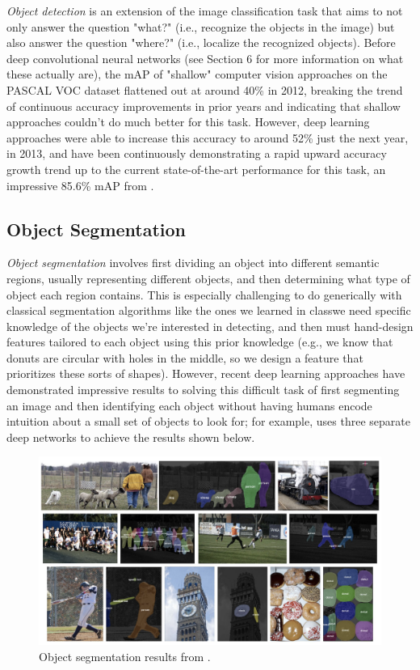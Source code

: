 \documentclass{article}
\begin{document}
\textit{Object detection} is an extension of the image classification task that aims to not only answer the question "what?" (i.e., recognize the objects in the image) but also answer the question "where?" (i.e., localize the recognized objects). Before deep convolutional neural networks (see Section 6 for more information on what these actually are), the mAP of "shallow" computer vision approaches on the PASCAL VOC dataset \cite{everingham2015pascal} flattened out at around 40\% in 2012, breaking the trend of continuous accuracy improvements in prior years and indicating that shallow approaches couldn't do much better for this task. However, deep learning approaches were able to increase this accuracy to around 52\% just the next year, in 2013, and have been continuously demonstrating a rapid upward accuracy growth trend up to the current state-of-the-art performance for this task, an impressive 85.6\% mAP from \cite{he2016deep}.

\subsection{Object Segmentation}

\textit{Object segmentation} involves first dividing an object into different semantic regions, usually representing different objects, and then determining what type of object each region contains. This is especially challenging to do generically with classical segmentation algorithms like the ones we learned in class\textemdash we need specific knowledge of the objects we're interested in detecting, and then must hand-design features tailored to each object using this prior knowledge (e.g., we know that donuts are circular with holes in the middle, so we design a feature that prioritizes these sorts of shapes). However, recent deep learning approaches have demonstrated impressive results to solving this difficult task of first segmenting an image and then identifying each object without having humans encode intuition about a small set of objects to look for; for example, \cite{semseg} uses three separate deep networks to achieve the results shown below.


\begin{figure}[b]
\includegraphics[width=12cm]{segmentation.png}
\centering
\caption{Object segmentation results from \cite{semseg}.}
\end{figure}
\end{document}
